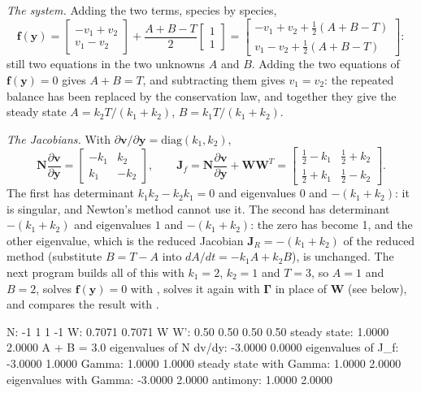 \documentclass[11pt,a4paper,openany]{report}
\begin{document}
{{\emph{The system.} Adding the two terms, species by species,
\[
  \mathbf{f}(\mathbf{y}) = \begin{bmatrix} -v_1 + v_2 \\ v_1 - v_2 \end{bmatrix}
       + \frac{A + B - T}{2} \begin{bmatrix} 1 \\ 1 \end{bmatrix}
       = \begin{bmatrix} -v_1 + v_2 + \tfrac12 (A + B - T) \\[2pt]
                          v_1 - v_2 + \tfrac12 (A + B - T) \end{bmatrix} :
\]
still two equations in the two unknowns $A$ and $B$. Adding the two
equations of $\mathbf{f}(\mathbf{y}) = 0$ gives $A + B = T$, and subtracting them gives $v_1 =
v_2$: the repeated balance has been replaced by the conservation law, and
together they give the steady state $A = k_2 T / (k_1 + k_2)$, $B = k_1 T /
(k_1 + k_2)$.

\emph{The Jacobians.} With $\partial \mathbf{v} / \partial \mathbf{y} = \mathrm{diag}(k_1,
k_2)$,
\[
  \mathbf{N} \frac{\partial \mathbf{v}}{\partial \mathbf{y}}
    = \begin{bmatrix} -k_1 & k_2 \\ k_1 & -k_2 \end{bmatrix} ,
  \qquad
  \mathbf{J}_f = \mathbf{N} \frac{\partial \mathbf{v}}{\partial \mathbf{y}} + \mathbf{W}\mathbf{W}^T
    = \begin{bmatrix} \tfrac12 - k_1 & \tfrac12 + k_2 \\[2pt]
                      \tfrac12 + k_1 & \tfrac12 - k_2 \end{bmatrix} .
\]
The first has determinant $k_1 k_2 - k_2 k_1 = 0$ and eigenvalues $0$ and
$-(k_1 + k_2)$: it is singular, and Newton's method cannot use it. The
second has determinant $-(k_1 + k_2)$ and eigenvalues $1$ and $-(k_1 +
k_2)$: the zero has become 1, and the other eigenvalue, which is the
reduced Jacobian $\mathbf{J}_R = -(k_1 + k_2)$ of the reduced method
(substitute $B = T - A$ into $dA/dt = -k_1 A + k_2 B$), is unchanged. The
next program builds all of this with $k_1 = 2$, $k_2 = 1$ and $T = 3$, so
$A = 1$ and $B = 2$, solves $\mathbf{f}(\mathbf{y}) = 0$ with , solves it
again with $\mathbf{\Gamma}$ in place of $\mathbf{W}$ (see below), and
compares the result with .

\begin{axonout}
N:
-1   1
 1  -1
W:
0.7071
0.7071
W W':
0.50  0.50
0.50  0.50
steady state: 1.0000  2.0000  A + B = 3.0
eigenvalues of N dv/dy: -3.0000  0.0000
eigenvalues of J_f: -3.0000  1.0000
Gamma: 1.0000  1.0000
steady state with Gamma: 1.0000  2.0000
eigenvalues with Gamma: -3.0000  2.0000
antimony: 1.0000  2.0000
\end{axonout}

}}
\end{document}

